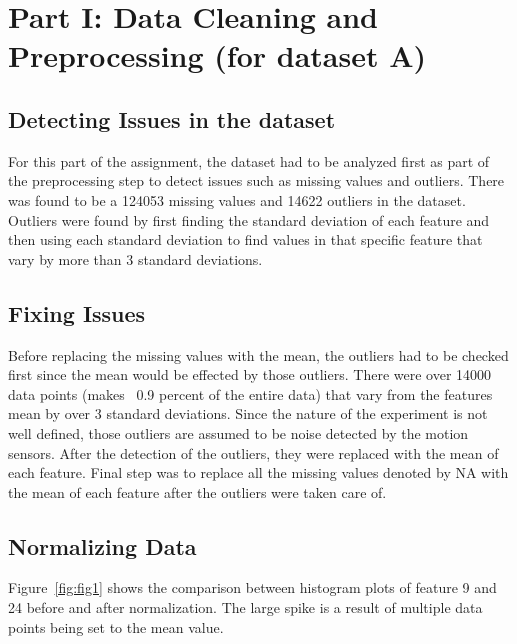 \section{Part I: Data Cleaning and Preprocessing (for dataset A)}
\subsection{Detecting Issues in the dataset}
For this part of the assignment, the dataset had to be analyzed first as part of the preprocessing step to detect issues such as missing values and outliers. There was found to be a 124053 missing values and 14622 outliers in the dataset. Outliers were found by first finding the standard deviation of each feature and then using each standard deviation to find values in that specific feature that vary by more than 3 standard deviations. 

\subsection{Fixing Issues}
Before replacing the missing values with the mean, the outliers had to be checked first since the mean would be effected by those outliers. There were over 14000 data points (makes ~0.9 percent of the entire data) that vary from the features mean by over 3 standard deviations. Since the nature of the experiment is not well defined, those outliers are assumed to be noise detected by the motion sensors. After the detection of the outliers, they were replaced with the mean of each feature. Final step was to replace all the missing values denoted by NA with the mean of each feature after the outliers were taken care of. 

\subsection{Normalizing Data}
Figure~\ref{fig:fig1} shows the comparison between histogram plots of feature 9 and 24 before and after normalization. The large spike is a result of multiple data points being set to the mean value.

%
%

